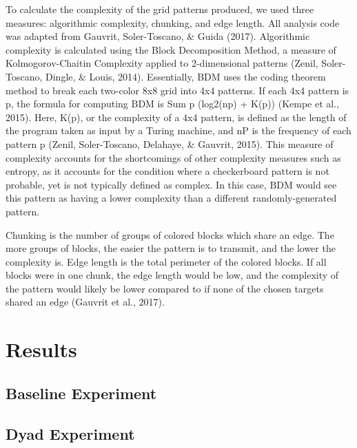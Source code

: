 \documentclass[10pt, letterpaper]{article}
\begin{document}
To calculate the complexity of the grid patterns produced, we used three
measures: algorithmic complexity, chunking, and edge length. All
analysis code was adapted from Gauvrit, Soler-Toscano, \& Guida (2017).
Algorithmic complexity is calculated using the Block Decomposition
Method, a measure of Kolmogorov-Chaitin Complexity applied to
2-dimensional patterns (Zenil, Soler-Toscano, Dingle, \& Louis, 2014).
Essentially, BDM uses the coding theorem method to break each two-color
8x8 grid into 4x4 patterns. If each 4x4 pattern is p, the formula for
computing BDM is Sum p (log2(np) + K(p)) (Kempe et al., 2015). Here,
K(p), or the complexity of a 4x4 pattern, is defined as the length of
the program taken as input by a Turing machine, and nP is the frequency
of each pattern p (Zenil, Soler-Toscano, Delahaye, \& Gauvrit, 2015).
This measure of complexity accounts for the shortcomings of other
complexity measures such as entropy, as it accounts for the condition
where a checkerboard pattern is not probable, yet is not typically
defined as complex. In this case, BDM would see this pattern as having a
lower complexity than a different randomly-generated pattern.

Chunking is the number of groups of colored blocks which share an edge.
The more groups of blocks, the easier the pattern is to transmit, and
the lower the complexity is. Edge length is the total perimeter of the
colored blocks. If all blocks were in one chunk, the edge length would
be low, and the complexity of the pattern would likely be lower compared
to if none of the chosen targets shared an edge (Gauvrit et al., 2017).

\section{Results}\label{results}

\subsection{Baseline Experiment}\label{baseline-experiment}

\subsection{Dyad Experiment}\label{dyad-experiment}
\end{document}

